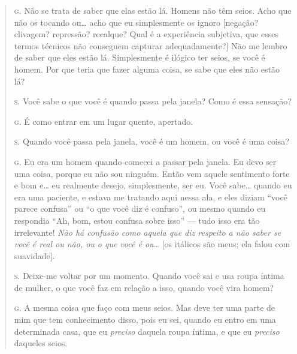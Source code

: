 \begin{quote}
\noindent\hskip0mm\textsc{g.} Não se trata de saber que elas estão lá. Homens não têm seios. Acho
que não os tocando ou\ldots{} acho que eu simplesmente os ignoro [negação?
clivagem? repressão? recalque? Qual é a experiência subjetiva, que
esses termos técnicos não conseguem capturar adequadamente?] Não me
lembro de saber que eles estão lá. Simplesmente é ilógico ter seios, se
você é homem. Por que teria que fazer alguma coisa, se sabe que eles
não estão lá?

\noindent\hskip0mm\textsc{s.} Você sabe o que você é quando passa pela janela? Como é essa
sensação?

\noindent\hskip0mm\textsc{g.} É como entrar em um lugar quente, apertado.

\noindent\hskip0mm\textsc{s.} Quando você passa pela janela, você é um homem, ou você é uma coisa?

\noindent\hskip0mm\textsc{g.} Eu era um homem quando comecei a passar pela janela. Eu devo ser uma
coisa, porque eu não sou ninguém. Então vem aquele sentimento forte e
bom e\ldots{} eu realmente desejo, simplesmente, ser eu. Você sabe\ldots{} quando
eu era uma paciente, e estava me tratando aqui nessa ala, e eles diziam
``você parece confusa'' ou ``o
que você diz é confuso'', ou mesmo quando eu respondia
``Ah, bom, estou confusa sobre isso'' ---
tudo isso era tão irrelevante! \textit{Não há confusão como aquela que
diz respeito a não saber se você é real ou não, ou o que você é ou}\ldots{}
[os itálicos são meus; ela falou com suavidade].

\noindent\hskip0mm\textsc{s.} Deixe-me voltar por um momento. Quando você sai e usa roupa íntima de
mulher, o que você faz em relação a isso, quando você vira homem?

\noindent\hskip0mm\textsc{g.} A mesma coisa que faço com meus seios. Mas deve ter uma parte de mim
que tem conhecimento disso, pois eu sei, quando eu entro em uma
determinada casa, que eu \textit{preciso} daquela roupa íntima, e que
eu \textit{preciso} daqueles seios.


\end{quote}
